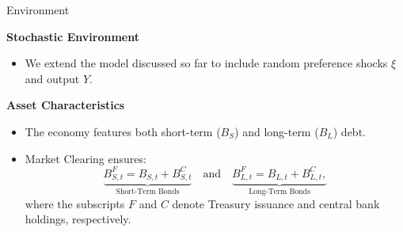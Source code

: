 \documentclass[11pt,aspectratio=169]{beamer}
\begin{document}
\begin{frame}{Environment}
\small

\textbf{Stochastic Environment}
\begin{itemize}
    \item We extend the model discussed so far to include random preference shocks $\xi$ and output $Y$.
\end{itemize}

\vspace{0.2cm}

\textbf{Asset Characteristics}
\begin{itemize}
    \item The economy features both short-term ($B_S$) and long-term ($B_L$) debt.
    \item Market Clearing ensures:
    \begin{equation*}
        \underbrace{B_{S,t}^{F} = B_{S,t}+B_{S,t}^{C}}_{\text{Short-Term Bonds}} \quad \text{and} \quad \underbrace{B_{L,t}^{F} = B_{L,t}+B_{L,t}^{C},}_{\text{Long-Term Bonds}}
    \end{equation*}
    where the subscripts $F$ and $C$ denote Treasury issuance and central bank  holdings, respectively.
\end{itemize}
\end{frame}
\end{document}
